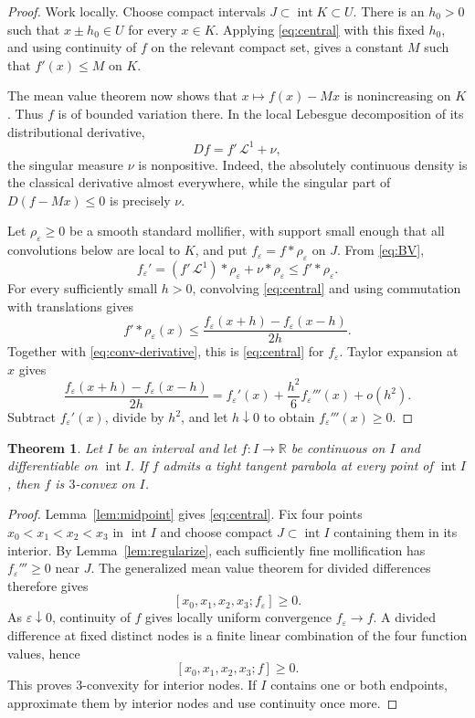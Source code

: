 \documentclass[10pt]{article}
\newtheorem{theorem}{Theorem}
\newcommand{\R}{\mathbb{R}}
\newcommand{\interior}{\operatorname{int}}
\newcommand{\Leb}{\mathcal L^1}
\begin{document}
\begin{proof}
Work locally.  Choose compact intervals $J\subset\interior K\subset U$.
There is an $h_0>0$ such that $x\pm h_0\in U$ for every $x\in K$.
Applying \eqref{eq:central} with this fixed $h_0$, and using continuity of
$f$ on the relevant compact set, gives a constant $M$ such that
$f'(x)\le M$ on $K$.

The mean value theorem now shows that $x\mapsto f(x)-Mx$ is nonincreasing on
$K$.  Thus $f$ is of bounded variation there.  In the local Lebesgue
decomposition of its distributional derivative,
\begin{equation}\label{eq:BV}
 Df=f'\,\Leb+\nu,
\end{equation}
the singular measure $\nu$ is nonpositive.  Indeed, the absolutely continuous
density is the classical derivative almost everywhere, while the singular
part of $D(f-Mx)\le0$ is precisely $\nu$.

Let $\rho_\varepsilon\ge0$ be a smooth standard mollifier, with support small
enough that all convolutions below are local to $K$, and put
$f_\varepsilon=f*\rho_\varepsilon$ on $J$.  From \eqref{eq:BV},
\begin{equation}\label{eq:conv-derivative}
 f_\varepsilon'
   =(f'\,\Leb)*\rho_\varepsilon+\nu*\rho_\varepsilon
   \le f'*\rho_\varepsilon.
\end{equation}
For every sufficiently small $h>0$, convolving \eqref{eq:central} and using
commutation with translations gives
\[
 f'*\rho_\varepsilon(x)
 \le \frac{f_\varepsilon(x+h)-f_\varepsilon(x-h)}{2h}.
\]
Together with \eqref{eq:conv-derivative}, this is \eqref{eq:central} for
$f_\varepsilon$.  Taylor expansion at $x$ gives
\[
 \frac{f_\varepsilon(x+h)-f_\varepsilon(x-h)}{2h}
 =f_\varepsilon'(x)+\frac{h^2}{6}f_\varepsilon'''(x)+o(h^2).
\]
Subtract $f_\varepsilon'(x)$, divide by $h^2$, and let $h\downarrow0$ to
obtain $f_\varepsilon'''(x)\ge0$.
\end{proof}

\begin{theorem}\label{thm:main}
Let $I$ be an interval and let $f:I\to\R$ be continuous on $I$ and
differentiable on $\interior I$.  If $f$ admits a tight tangent parabola at
every point of $\interior I$, then $f$ is $3$-convex on $I$.
\end{theorem}

\begin{proof}
Lemma~\ref{lem:midpoint} gives \eqref{eq:central}.  Fix four points
$x_0<x_1<x_2<x_3$ in $\interior I$ and choose compact
$J\subset\interior I$ containing them in its interior.  By
Lemma~\ref{lem:regularize}, each sufficiently fine mollification has
$f_\varepsilon'''\ge0$ near $J$.  The generalized mean value theorem for
divided differences therefore gives
\[
 [x_0,x_1,x_2,x_3;f_\varepsilon]\ge0.
\]
As $\varepsilon\downarrow0$, continuity of $f$ gives locally uniform
convergence $f_\varepsilon\to f$.  A divided difference at fixed distinct
nodes is a finite linear combination of the four function values, hence
\[
 [x_0,x_1,x_2,x_3;f]\ge0.
\]
This proves $3$-convexity for interior nodes.  If $I$ contains one or both
endpoints, approximate them by interior nodes and use continuity once more.
\end{proof}
\end{document}
